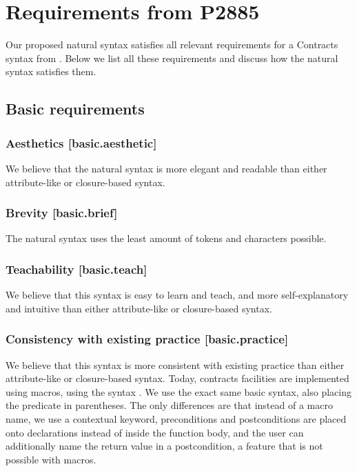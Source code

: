 \section{Requirements from P2885}
\label{sec:requirements}

Our proposed natural syntax satisfies all relevant requirements for a Contracts syntax from \cite{P2885R3}. Below we list all these requirements and discuss how the natural syntax satisfies them.

\subsection{Basic requirements}

\subsubsection{Aesthetics  [basic.aesthetic]}

We believe that the natural syntax is more elegant and readable than either attribute-like or closure-based syntax.

\subsubsection{Brevity  [basic.brief]}

The natural syntax uses the least amount of tokens and characters possible.

\subsubsection{Teachability  [basic.teach]}

We believe that this syntax is easy to learn and teach, and more self-explanatory and intuitive than either attribute-like or closure-based syntax.

\subsubsection{Consistency with existing practice  [basic.practice]}

We believe that this syntax is more consistent with existing practice than either attribute-like or closure-based syntax. Today, contracts facilities are implemented using macros, using the syntax . We use the exact same basic syntax, also placing the predicate in parentheses. The only differences are that instead of a macro name, we use a contextual keyword, preconditions and postconditions are placed onto declarations instead of inside the function body, and the user can additionally name the return value in a postcondition, a feature that is not possible with macros.

